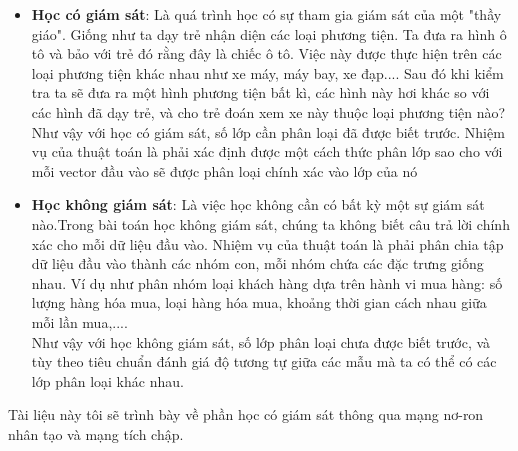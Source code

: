 \begin{itemize}
	\item \textbf{Học có giám sát}: Là quá trình học có sự tham gia giám sát của một "thầy giáo". Giống như ta dạy trẻ nhận diện các loại phương tiện. Ta đưa ra hình ô tô và bảo với trẻ đó rằng đây là chiếc ô tô. Việc này được thực hiện trên các loại phương tiện khác nhau như xe máy, máy bay, xe đạp.... Sau đó khi kiểm tra ta sẽ đưa ra một hình phương tiện bất kì, các hình này hơi khác so với các hình đã dạy trẻ, và cho trẻ đoán xem xe này thuộc loại phương tiện nào?\\
	Như vậy với học có giám sát, số lớp cần phân loại đã được biết trước. Nhiệm vụ của thuật toán là phải xác định được một cách thức phân lớp sao cho với mỗi vector đầu vào sẽ được phân loại chính xác vào lớp của nó
	
	\item \textbf{Học không giám sát}: Là việc học không cần có bất kỳ một sự giám sát nào.Trong bài toán học không giám sát, chúng ta không biết câu trả lời chính xác cho mỗi dữ liệu đầu vào. Nhiệm vụ của thuật toán là phải phân chia tập dữ liệu đầu vào thành các nhóm con, mỗi nhóm chứa các đặc trưng giống nhau. Ví dụ như phân nhóm loại khách hàng dựa trên hành vi mua hàng: số lượng hàng hóa mua, loại hàng hóa mua, khoảng thời gian cách nhau giữa mỗi lần mua,....\\
	 Như vậy với học không giám sát, số lớp phân loại chưa được biết trước, và tùy theo tiêu chuẩn đánh giá độ tương tự giữa các mẫu mà ta có thể có các lớp phân loại khác nhau.

\end{itemize}
Tài liệu này tôi sẽ trình bày về phần học có giám sát thông qua mạng nơ-ron nhân tạo và mạng tích chập.



